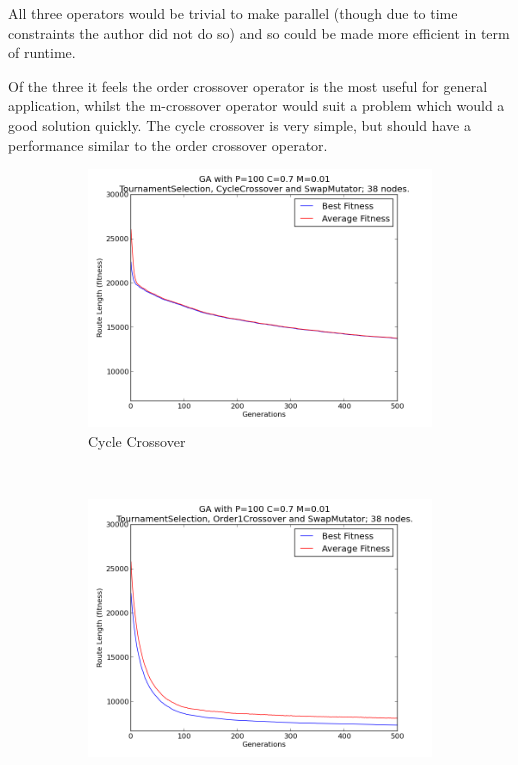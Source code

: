 \documentclass[10pt, a4paper]{article}
\begin{document}
All three operators would be trivial to make parallel (though due to time
constraints the author did not do so) and so could be made more efficient in
term of runtime.

Of the three it feels the order crossover operator is the most useful for
general application, whilst the m-crossover operator would suit a problem which
would a good solution quickly. The cycle crossover is very simple, but should
have a performance similar to the order crossover operator.


\begin{figure}[h]
\centering

\begin{subfigure}[b]{0.67\textwidth}
\includegraphics[width=\textwidth]{img/results/cyclecrossover/swapmutator/n38p100c07m001}
\caption{Cycle Crossover}
\end{subfigure}
~
\begin{subfigure}[b]{0.67\textwidth}
\includegraphics[width=\textwidth]{img/results/order1crossover/swapmutator/n38p100c07m001}

\end{subfigure}
\end{figure}
\end{document}
